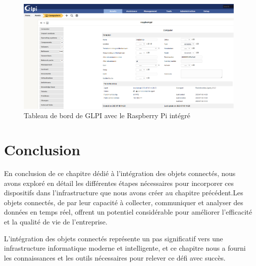 \begin{figure}[H]
\centering
\includegraphics[width=16.5cm]{Images/RASPBERRYPIGLPI.png}
\caption{Tableau de bord de GLPI avec le Raspberry Pi intégré}
\label{fig:glpi-raspberry}
\end{figure}

\bigskip

\section{Conclusion}

En conclusion de ce chapitre dédié à l'intégration des objets connectés, nous avons exploré en détail les différentes étapes nécessaires pour incorporer ces dispositifs dans l'infrastructure que nous avons créer au chapitre précédent.Les objets connectés, de par leur capacité à collecter, communiquer et analyser des données en temps réel, offrent un potentiel considérable pour améliorer l'efficacité et la qualité de vie de l'entreprise.

L'intégration des objets connectés représente un pas significatif vers une infrastructure informatique moderne et intelligente, et ce chapitre nous a fourni les connaissances et les outils nécessaires pour relever ce défi avec succès.